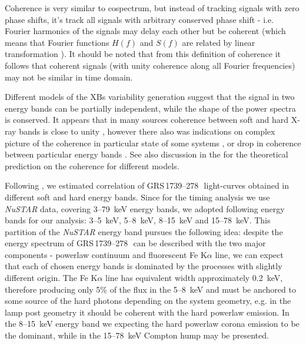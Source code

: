 \documentclass[a4paper,fleqn,usenatbib]{mnras}
\def\grs{{GRS\,1739--278\,}}
\begin{document}
Coherence is very similar to cospectrum, but instead of tracking signals with zero phase shifts, it's track all signals with arbitrary conserved phase shift - i.e. Fourier harmonics of the signals may delay each other but be coherent (which means that Fourier functions $H(f)$ and $S(f)$ are related by linear transformation \citep{1997ApJ...474L..43V}).
It should be noted that from this definition of coherence it follows that coherent signals (with unity coherence along all Fourier frequencies) may not be similar in time domain. 

Different models of the XBs variability generation suggest that the signal in two energy bands can be partially independent, while the shape of the power spectra is conserved.
It appears that in many sources coherence between soft and hard X-ray bands is close to unity \citep{1999ApJ...517..355N, 1999ApJ...514..939W}, however there also was indications on complex picture of the coherence in particular state of some systems \citep{2003ApJ...584L..23J}, or drop in coherence between particular energy bands \citep[e.g. in GX 339--4][]{1997ApJ...474L..43V}.
See also discussion in the \citep{1997ApJ...474L..43V} for the theoretical prediction on the coherence for different models.


Following \citep{1997ApJ...474L..43V}, we estimated correlation of \grs\ light-curves obtained in different soft and hard energy bands. 
Since for the timing analysis we use {\it NuSTAR} data, covering 3--79~keV energy bands, we adopted following energy bands for our analysis: 3--5~keV, 5--8~keV, 8--15~keV and 15--78~keV.
This partition of the {\it NuSTAR} energy band pursues the following idea: despite the energy spectrum of \grs\ can be described with the two major components - powerlaw continuum and fluorescent Fe K$\alpha$ line, we can expect that each of chosen energy bands is dominated by the processes with slightly different origin. 
The Fe K$\alpha$ line has equivalent width approximately 0.2~keV, therefore producing only 5\% of the flux in the 5--8~keV and must be anchored to some source of the hard photons depending on the system geometry, e.g. in the lamp post geometry it should be coherent with the hard powerlaw emission. 
In the 8--15~keV energy band we expecting the hard powerlaw corona emission to be the dominant, while in the 15--78~keV Compton hump may be presented.
\end{document}

